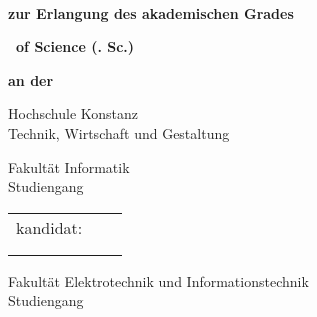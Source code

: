 \begin{titlepage}

\AddToShipoutPicture*{\BackgroundImgTitelPage}

\vspace*{\bigskipamount}


{\makeatletter
\fboxsep=0pt
\colorbox{htwg-white}{\begin{minipage}[t]{145mm}
    \begin{flushleft}
        \color{htwg-teal}\Huge{\@report@typetext}
        \\
        \color{htwg-teal}\Huge\textbf{\@title}
    \end{flushleft}
\end{minipage}}
\makeatother}

\bigskip
\bigskip

{
\setlength{\parskip}{0.5cm}
\begin{center}
	\textbf{zur Erlangung des akademischen Grades}
	
	\textbf{\Large \type\ of Science (\typeshortcut. Sc.)}
	
	\textbf{an der}
	
	\textsf{\huge Hochschule Konstanz}\\
	{\small Technik, Wirtschaft und Gestaltung}

	
\end{center}
}

\bigskip

{
\setlength{\parskip}{0.5cm}
\begin{center}
	\begingroup
	\textsf{\Large Fakultät Informatik} \\
	Studiengang \studiengang  

	\renewcommand*{\arraystretch}{1} 
	{\makeatletter
		\begin{tabular}{lll}
			\type kandidat: & \verfasserA \\
							& \strasseA \\
							& \wohnortA 
		\end{tabular}
		\makeatother}
	\endgroup
\end{center}
}
		
{
\setlength{\parskip}{0.5cm}
\begin{center}
	\begingroup
	\textsf{\Large Fakultät Elektrotechnik und Informationstechnik} \\
	Studiengang \studiengang 
	

\end{center}}
\end{titlepage}
